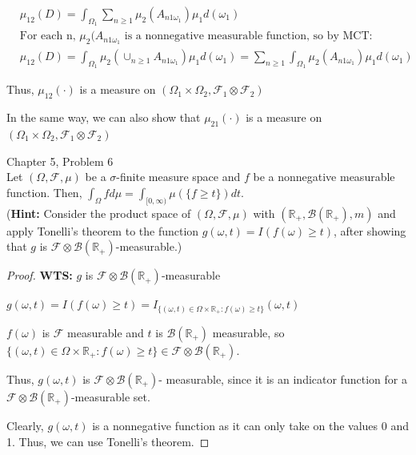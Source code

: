 \documentclass[12pt,letterpaper, onecolumn]{exam}
\newcommand{\real}{\mathbb{R}}
\newcommand{\calB}{\mathcal{B}}
\newcommand{\calF}{\mathcal{F}}
\begin{document}
\begin{questions}
\begin{solution}
\begin{itemize}
\begin{align*}
                & \mu_{12}(D) = \int_{\Omega_1}\sum_{n\geq 1}\mu_2( A_{n 1 \omega_1})\mu_1d(\omega_1) \\
                & \textrm{For each n, } \mu_2(A_{n 1 \omega_1} \textrm{ is a nonnegative measurable function, so by MCT:} \\
                & \mu_{12}(D) = \int_{\Omega_1}\mu_2(\cup_{n\geq 1} A_{n 1 \omega_1})\mu_1d(\omega_1) = \sum_{n\geq 1} \int_{\Omega_1}\mu_2( A_{n 1 \omega_1})\mu_1d(\omega_1)
            \end{align*}
        \end{itemize}
        Thus, $\mu_{12}(\cdot)$ is a measure on $(\Omega_1 \times \Omega_2, \calF_1 \otimes \calF_2)$

        In the same way, we can also show that $\mu_{21}(\cdot)$ is a measure on $(\Omega_1 \times \Omega_2, \calF_1 \otimes \calF_2)$
    \end{solution}

    \question Chapter 5, Problem 6\\
    Let $(\Omega, \calF,\mu)$ be a $\sigma$-finite measure space and $f$ be a nonnegative measurable function. Then, 
    $\int_\Omega fd\mu = \int_{[0,\infty)}\mu(\{f \geq t\})dt. $ \\ (\textbf{Hint:} Consider the product space of $(\Omega, \calF,\mu)$ with $(\real_+, \calB(\real_+),m)$ and apply Tonelli’s theorem to the function $g(\omega, t)=I(f(\omega) \geq t)$, after showing that $g$ is $\calF \otimes \calB(\real_+)$-measurable.)

    \begin{solution}
        \begin{proof}
            \textbf{WTS:} $g$ is $\calF \otimes \calB(\real_+)$-measurable

            $g(\omega, t) = I(f(\omega) \geq t) = I_{\{(\omega, t) \in \Omega \times \real_+: f(\omega) \geq t\}}(\omega, t)$

            $f(\omega)$ is $\calF$ measurable and $t$ is $\calB(\real_+)$ measurable, so $\{(\omega, t) \in \Omega \times \real_+: f(\omega) \geq t\} \in \calF \otimes \calB(\real_+)$.

            Thus, $g(\omega, t)$ is $\calF \otimes \calB(\real_+)$- measurable, since it is an indicator function for a $\calF \otimes \calB(\real_+)$-measurable set.

            Clearly, $g(\omega, t)$ is a nonnegative function as it can only take on the values 0 and 1. Thus, we can use Tonelli's theorem.
            

\end{proof}
\end{solution}
\end{questions}
\end{document}
